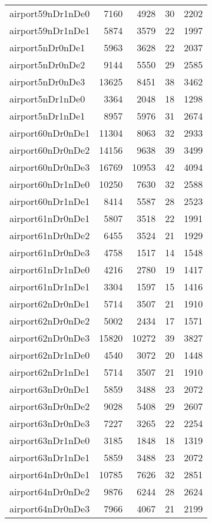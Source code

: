 \begin{tabular}{lrrrr}
airport59nDr1nDe0 & 7160 & 4928 & 30 & 2202 \\
airport59nDr1nDe1 & 5874 & 3579 & 22 & 1997 \\
airport5nDr0nDe1 & 5963 & 3628 & 22 & 2037 \\
airport5nDr0nDe2 & 9144 & 5550 & 29 & 2585 \\
airport5nDr0nDe3 & 13625 & 8451 & 38 & 3462 \\
airport5nDr1nDe0 & 3364 & 2048 & 18 & 1298 \\
airport5nDr1nDe1 & 8957 & 5976 & 31 & 2674 \\
airport60nDr0nDe1 & 11304 & 8063 & 32 & 2933 \\
airport60nDr0nDe2 & 14156 & 9638 & 39 & 3499 \\
airport60nDr0nDe3 & 16769 & 10953 & 42 & 4094 \\
airport60nDr1nDe0 & 10250 & 7630 & 32 & 2588 \\
airport60nDr1nDe1 & 8414 & 5587 & 28 & 2523 \\
airport61nDr0nDe1 & 5807 & 3518 & 22 & 1991 \\
airport61nDr0nDe2 & 6455 & 3524 & 21 & 1929 \\
airport61nDr0nDe3 & 4758 & 1517 & 14 & 1548 \\
airport61nDr1nDe0 & 4216 & 2780 & 19 & 1417 \\
airport61nDr1nDe1 & 3304 & 1597 & 15 & 1416 \\
airport62nDr0nDe1 & 5714 & 3507 & 21 & 1910 \\
airport62nDr0nDe2 & 5002 & 2434 & 17 & 1571 \\
airport62nDr0nDe3 & 15820 & 10272 & 39 & 3827 \\
airport62nDr1nDe0 & 4540 & 3072 & 20 & 1448 \\
airport62nDr1nDe1 & 5714 & 3507 & 21 & 1910 \\
airport63nDr0nDe1 & 5859 & 3488 & 23 & 2072 \\
airport63nDr0nDe2 & 9028 & 5408 & 29 & 2607 \\
airport63nDr0nDe3 & 7227 & 3265 & 22 & 2254 \\
airport63nDr1nDe0 & 3185 & 1848 & 18 & 1319 \\
airport63nDr1nDe1 & 5859 & 3488 & 23 & 2072 \\
airport64nDr0nDe1 & 10785 & 7626 & 32 & 2851 \\
airport64nDr0nDe2 & 9876 & 6244 & 28 & 2624 \\
airport64nDr0nDe3 & 7966 & 4067 & 21 & 2199 \\

\end{tabular}
